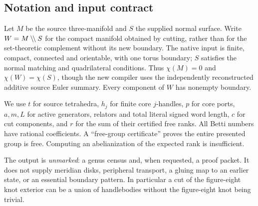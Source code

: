 \subsection{Notation and input contract}

Let $M$ be the source three-manifold and $S$ the supplied normal surface. Write
$W=M\mathbin{\backslash\!\backslash} S$ for the compact manifold obtained by cutting, rather than for the
set-theoretic complement without its new boundary. The native input is finite,
compact, connected and orientable, with one torus boundary; $S$ satisfies the
normal matching and quadrilateral conditions. Thus $\chi(M)=0$ and
$\chi(W)=\chi(S)$, though the new compiler uses the independently reconstructed
additive source Euler summary. Every component of $W$ has nonempty boundary.

We use $t$ for source tetrahedra, $h_j$ for finite core $j$-handles, $p$ for core
ports, $a,m,L$ for active generators, relators and total literal signed word
length, $c$ for cut components, and $r$ for the sum of their certified free
ranks. All Betti numbers have rational coefficients. A ``free-group
certificate'' proves the entire presented group is free. Computing an
abelianization of the expected rank is insufficient.

The output is \emph{unmarked}: a genus census and, when requested, a proof
packet. It does not supply meridian disks, peripheral transport, a gluing map
to an earlier state, or an essential boundary pattern. In particular a cut of
the figure-eight knot exterior can be a union of handlebodies without the
figure-eight knot being trivial.
